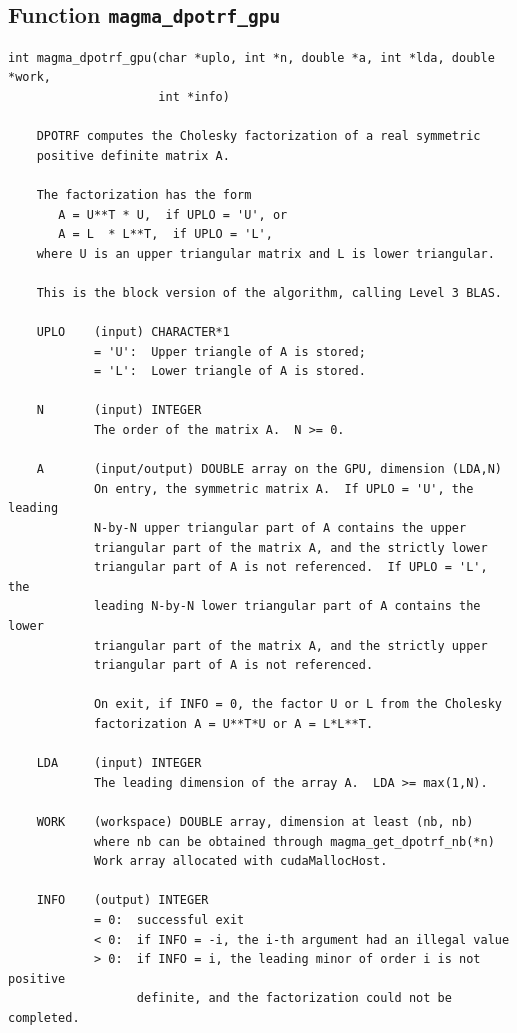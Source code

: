 \documentclass[10pt]{book}
\begin{document}
\subsection{Function {\tt {\bf magma\_dpotrf\_gpu}}}
\begin{verbatim}
int magma_dpotrf_gpu(char *uplo, int *n, double *a, int *lda, double *work, 
                     int *info)
   
    DPOTRF computes the Cholesky factorization of a real symmetric   
    positive definite matrix A.   

    The factorization has the form   
       A = U**T * U,  if UPLO = 'U', or   
       A = L  * L**T,  if UPLO = 'L',   
    where U is an upper triangular matrix and L is lower triangular.   

    This is the block version of the algorithm, calling Level 3 BLAS.   

    UPLO    (input) CHARACTER*1   
            = 'U':  Upper triangle of A is stored;   
            = 'L':  Lower triangle of A is stored.   

    N       (input) INTEGER   
            The order of the matrix A.  N >= 0.   

    A       (input/output) DOUBLE array on the GPU, dimension (LDA,N)   
            On entry, the symmetric matrix A.  If UPLO = 'U', the leading   
            N-by-N upper triangular part of A contains the upper   
            triangular part of the matrix A, and the strictly lower   
            triangular part of A is not referenced.  If UPLO = 'L', the   
            leading N-by-N lower triangular part of A contains the lower   
            triangular part of the matrix A, and the strictly upper   
            triangular part of A is not referenced.   

            On exit, if INFO = 0, the factor U or L from the Cholesky   
            factorization A = U**T*U or A = L*L**T.   

    LDA     (input) INTEGER   
            The leading dimension of the array A.  LDA >= max(1,N).   

    WORK    (workspace) DOUBLE array, dimension at least (nb, nb)
            where nb can be obtained through magma_get_dpotrf_nb(*n)
            Work array allocated with cudaMallocHost.

    INFO    (output) INTEGER   
            = 0:  successful exit   
            < 0:  if INFO = -i, the i-th argument had an illegal value   
            > 0:  if INFO = i, the leading minor of order i is not positive 
                  definite, and the factorization could not be completed.   
\end{verbatim}
\end{document}
